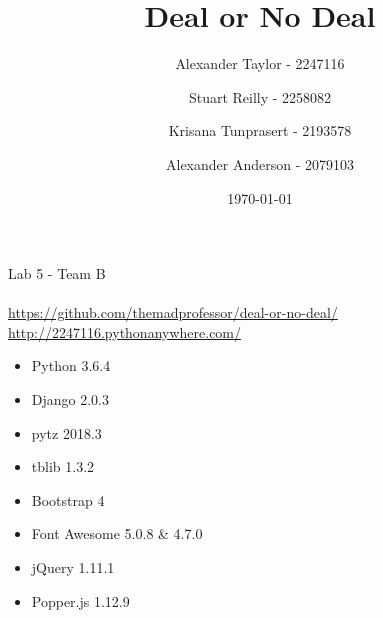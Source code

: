 \documentclass[11pt, a4paper]{article}
\author{Alexander Taylor - 2247116 \and Stuart Reilly - 2258082 \and Krisana Tunprasert - 2193578\and Alexander Anderson - 2079103}
\title{Deal or No Deal}
\date{\today}
\begin{document}
    \maketitle

    Lab 5 - Team B\\\\
    \url{https://github.com/themadprofessor/deal-or-no-deal/}\\
    \url{http://2247116.pythonanywhere.com/}\\
    \begin{itemize}
        \item Python 3.6.4
        \item Django 2.0.3
        \item pytz 2018.3
        \item tblib 1.3.2
        \item Bootstrap 4
        \item Font Awesome 5.0.8 \& 4.7.0
        \item jQuery 1.11.1
        \item Popper.js 1.12.9
    \end{itemize}
\end{document}
